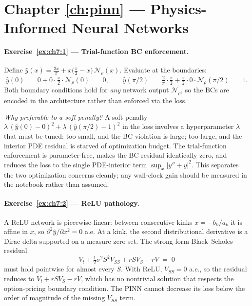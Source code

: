 \documentclass[11pt,a4paper]{report}
\begin{document}
\section{Chapter \ref{ch:pinn} --- Physics-Informed Neural Networks}
\label{sol:ch7}

\paragraph{Exercise~\ref{ex:ch7:1} --- Trial-function BC enforcement.}
Define $\hat y(x) = \tfrac{2x}{\pi} + x\bigl(\tfrac{\pi}{2} - x\bigr)\,\mathcal{N}_\rho(x)$.  Evaluate at the boundaries:
\[
   \hat y(0) \;=\; 0 + 0 \cdot \tfrac{\pi}{2}\cdot \mathcal{N}_\rho(0) \;=\; 0,
   \qquad
   \hat y(\pi/2) \;=\; \tfrac{2}{\pi}\cdot\tfrac{\pi}{2} + \tfrac{\pi}{2}\cdot 0\cdot \mathcal{N}_\rho(\pi/2) \;=\; 1.
\]
Both boundary conditions hold for \emph{any} network output $\mathcal{N}_\rho$, so the BCs are encoded in the architecture rather than enforced via the loss.

\emph{Why preferable to a soft penalty?}  A soft penalty $\lambda\,(\hat y(0) - 0)^2 + \lambda\,(\hat y(\pi/2) - 1)^2$ in the loss involves a hyperparameter $\lambda$ that must be tuned: too small, and the BC violation is large; too large, and the interior PDE residual is starved of optimization budget.  The trial-function enforcement is parameter-free, makes the BC residual identically zero, and reduces the loss to the single PDE-interior term $\sup_x |y'' + y|^2$.  This separates the two optimization concerns cleanly; any wall-clock gain should be measured in the notebook rather than assumed.

\paragraph{Exercise~\ref{ex:ch7:2} --- ReLU pathology.}
A ReLU network is piecewise-linear: between consecutive kinks $x = -b_k/a_k$ it is affine in $x$, so $\partial^2 \hat y/\partial x^2 = 0$ a.e.  At a kink, the second distributional derivative is a Dirac delta supported on a measure-zero set.  The strong-form Black--Scholes residual
\[
   V_t + \tfrac{1}{2}\sigma^2 S^2 V_{SS} + rS V_S - rV \;=\; 0
\]
must hold pointwise for almost every $S$.  With ReLU, $V_{SS} = 0$ a.e., so the residual reduces to $V_t + rS V_S - rV$, which has no nontrivial solution that respects the option-pricing boundary condition.  The PINN cannot decrease its loss below the order of magnitude of the missing $V_{SS}$ term.
\end{document}
